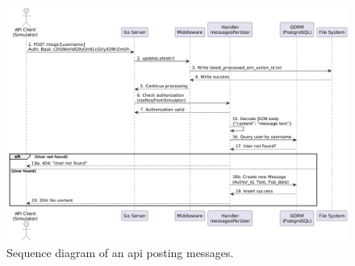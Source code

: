 \begin{figure}[H]
\includegraphics[width=\textwidth]{images/api-seq-diagram.png}
\centering
\caption{Sequence diagram of an api posting messages.}
\label{fig:api-seq}
\end{figure}

